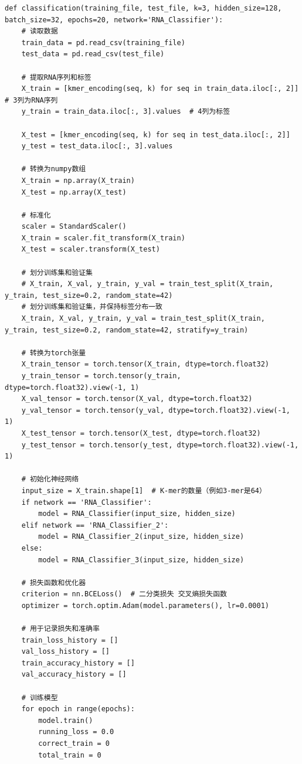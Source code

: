 \documentclass[a4paper,11pt,AutoFakeBold]{ctexart}
\begin{document}
\begin{lstlisting}
def classification(training_file, test_file, k=3, hidden_size=128, batch_size=32, epochs=20, network='RNA_Classifier'):
    # 读取数据
    train_data = pd.read_csv(training_file)
    test_data = pd.read_csv(test_file)

    # 提取RNA序列和标签
    X_train = [kmer_encoding(seq, k) for seq in train_data.iloc[:, 2]]  # 3列为RNA序列
    y_train = train_data.iloc[:, 3].values  # 4列为标签
    
    X_test = [kmer_encoding(seq, k) for seq in test_data.iloc[:, 2]]
    y_test = test_data.iloc[:, 3].values
    
    # 转换为numpy数组
    X_train = np.array(X_train)
    X_test = np.array(X_test)

    # 标准化
    scaler = StandardScaler()
    X_train = scaler.fit_transform(X_train)
    X_test = scaler.transform(X_test)
    
    # 划分训练集和验证集
    # X_train, X_val, y_train, y_val = train_test_split(X_train, y_train, test_size=0.2, random_state=42)
    # 划分训练集和验证集，并保持标签分布一致
    X_train, X_val, y_train, y_val = train_test_split(X_train, y_train, test_size=0.2, random_state=42, stratify=y_train)
    
    # 转换为torch张量
    X_train_tensor = torch.tensor(X_train, dtype=torch.float32)
    y_train_tensor = torch.tensor(y_train, dtype=torch.float32).view(-1, 1)
    X_val_tensor = torch.tensor(X_val, dtype=torch.float32)
    y_val_tensor = torch.tensor(y_val, dtype=torch.float32).view(-1, 1)
    X_test_tensor = torch.tensor(X_test, dtype=torch.float32)
    y_test_tensor = torch.tensor(y_test, dtype=torch.float32).view(-1, 1)
    
    # 初始化神经网络
    input_size = X_train.shape[1]  # K-mer的数量（例如3-mer是64）
    if network == 'RNA_Classifier':
        model = RNA_Classifier(input_size, hidden_size)
    elif network == 'RNA_Classifier_2':
        model = RNA_Classifier_2(input_size, hidden_size)
    else:
        model = RNA_Classifier_3(input_size, hidden_size)
    
    # 损失函数和优化器
    criterion = nn.BCELoss()  # 二分类损失 交叉熵损失函数
    optimizer = torch.optim.Adam(model.parameters(), lr=0.0001)
    
    # 用于记录损失和准确率
    train_loss_history = []
    val_loss_history = []
    train_accuracy_history = []
    val_accuracy_history = []
    
    # 训练模型
    for epoch in range(epochs):
        model.train()
        running_loss = 0.0
        correct_train = 0
        total_train = 0
        

\end{lstlisting}
\end{document}
